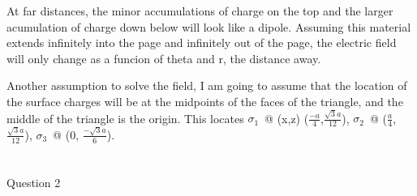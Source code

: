 \documentclass[a4paper,landscape]{article}
\newcommand{\F}[2]{\ensuremath{\frac{#1}{#2}}}
\newcommand{\Q}{\newpage \section*{}}
\begin{document}
\begin{landscape}
At far distances, the minor accumulations of charge on the top and the larger acumulation of charge down below will look like a dipole.  Assuming this material extends infinitely into the page and infinitely out of the page, the electric field will only change as a funcion of theta and r, the distance away.

Another assumption to solve the field, I am going to assume that the location of the surface charges will be at the midpoints of the faces of the triangle, and the middle of the triangle is the origin.  This locates $\sigma_1$~@ (x,z) ($\F{-a}{4}$,$\F{\sqrt{3}a}{12}$), $\sigma_2$~@ ($\F{a}{4}$, $\F{\sqrt{3}a}{12}$), $\sigma_3$~@ ($0$, $\F{-\sqrt{3}a}{6}$).
\Q{Question 2}


\end{landscape}
\end{document}
